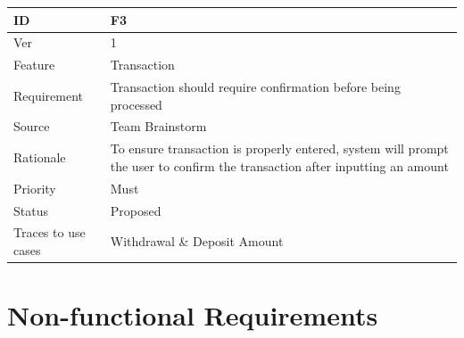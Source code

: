 \documentclass[12pt]{article}
\begin{document}
\begin{table}
  \begin{center}
    \begin{tabular}{|l|p{10cm}|}
      \hline
      \bf ID & \bf {F3}\\
      \hline
      Ver & 1\\
      \hline
      Feature & Transaction\\
      \hline
      Requirement & Transaction should require confirmation before being processed\\
      \hline
      Source & Team Brainstorm\\
      \hline
      Rationale & To ensure transaction is properly entered, system will prompt the user to confirm the transaction after inputting an amount\\
      \hline
      Priority & Must\\
      \hline
      Status & Proposed\\
      \hline
      Traces to use cases & Withdrawal \& Deposit Amount\\
      \hline
    \end{tabular}
  \end{center}
\end{table}

\section{Non-functional Requirements}
\end{document}
